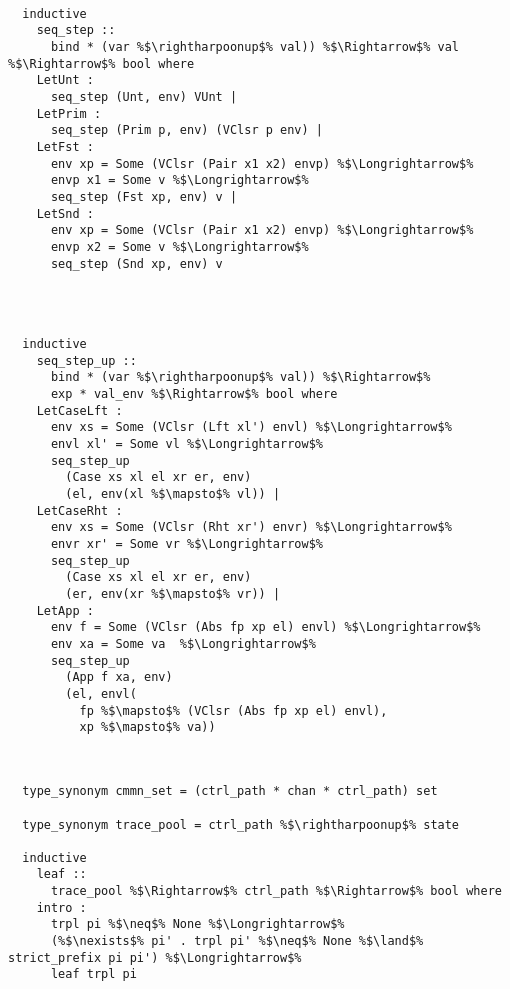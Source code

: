 \documentclass{article}
\begin{document}
\begin{lstlisting}[style=codestyle1, escapechar=\%]

  inductive
    seq_step ::
      bind * (var %$\rightharpoonup$% val)) %$\Rightarrow$% val %$\Rightarrow$% bool where
    LetUnt : 
      seq_step (Unt, env) VUnt |
    LetPrim :
      seq_step (Prim p, env) (VClsr p env) |
    LetFst :
      env xp = Some (VClsr (Pair x1 x2) envp) %$\Longrightarrow$%
      envp x1 = Some v %$\Longrightarrow$% 
      seq_step (Fst xp, env) v |
    LetSnd : 
      env xp = Some (VClsr (Pair x1 x2) envp) %$\Longrightarrow$%  
      envp x2 = Some v %$\Longrightarrow$% 
      seq_step (Snd xp, env) v


  \end{lstlisting}
\begin{lstlisting}[style=codestyle1, escapechar=\%]


  inductive
    seq_step_up ::
      bind * (var %$\rightharpoonup$% val)) %$\Rightarrow$%
      exp * val_env %$\Rightarrow$% bool where 
    LetCaseLft :
      env xs = Some (VClsr (Lft xl') envl) %$\Longrightarrow$%
      envl xl' = Some vl %$\Longrightarrow$%
      seq_step_up
        (Case xs xl el xr er, env)
        (el, env(xl %$\mapsto$% vl)) |
    LetCaseRht : 
      env xs = Some (VClsr (Rht xr') envr) %$\Longrightarrow$% 
      envr xr' = Some vr %$\Longrightarrow$%
      seq_step_up
        (Case xs xl el xr er, env)
        (er, env(xr %$\mapsto$% vr)) |
    LetApp :
      env f = Some (VClsr (Abs fp xp el) envl) %$\Longrightarrow$% 
      env xa = Some va  %$\Longrightarrow$% 
      seq_step_up
        (App f xa, env)
        (el, envl(
          fp %$\mapsto$% (VClsr (Abs fp xp el) envl),
          xp %$\mapsto$% va))

  \end{lstlisting}
\begin{lstlisting}[style=codestyle1, escapechar=\%]


  type_synonym cmmn_set = (ctrl_path * chan * ctrl_path) set

  type_synonym trace_pool = ctrl_path %$\rightharpoonup$% state

  inductive
    leaf ::
      trace_pool %$\Rightarrow$% ctrl_path %$\Rightarrow$% bool where
    intro :
      trpl pi %$\neq$% None %$\Longrightarrow$% 
      (%$\nexists$% pi' . trpl pi' %$\neq$% None %$\land$% strict_prefix pi pi') %$\Longrightarrow$%  
      leaf trpl pi

  \end{lstlisting}
\end{document}
